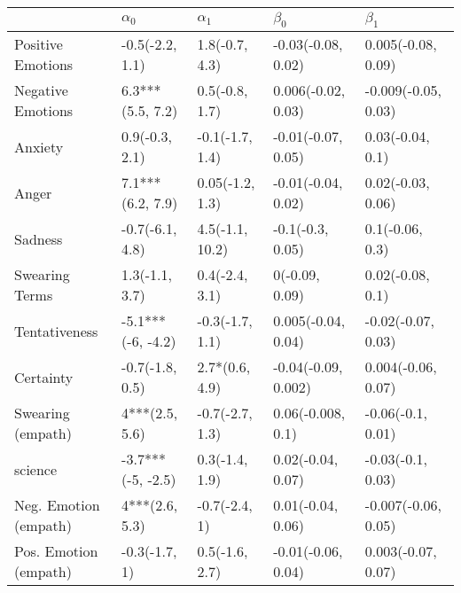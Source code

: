 \begin{tabular}{lllll}
\toprule
{} &         $\alpha_0$ &       $\alpha_1$ &            $\beta_0$ &            $\beta_1$ \\
\midrule
Positive Emotions     &    -0.5(-2.2, 1.1) &   1.8(-0.7, 4.3) &   -0.03(-0.08, 0.02) &   0.005(-0.08, 0.09) \\
Negative Emotions     &   6.3***(5.5, 7.2) &   0.5(-0.8, 1.7) &   0.006(-0.02, 0.03) &  -0.009(-0.05, 0.03) \\
Anxiety               &     0.9(-0.3, 2.1) &  -0.1(-1.7, 1.4) &   -0.01(-0.07, 0.05) &     0.03(-0.04, 0.1) \\
Anger                 &   7.1***(6.2, 7.9) &  0.05(-1.2, 1.3) &   -0.01(-0.04, 0.02) &    0.02(-0.03, 0.06) \\
Sadness               &    -0.7(-6.1, 4.8) &  4.5(-1.1, 10.2) &     -0.1(-0.3, 0.05) &      0.1(-0.06, 0.3) \\
Swearing Terms        &     1.3(-1.1, 3.7) &   0.4(-2.4, 3.1) &       0(-0.09, 0.09) &     0.02(-0.08, 0.1) \\
Tentativeness         &  -5.1***(-6, -4.2) &  -0.3(-1.7, 1.1) &   0.005(-0.04, 0.04) &   -0.02(-0.07, 0.03) \\
Certainty             &    -0.7(-1.8, 0.5) &   2.7*(0.6, 4.9) &  -0.04(-0.09, 0.002) &   0.004(-0.06, 0.07) \\
Swearing (empath)     &     4***(2.5, 5.6) &  -0.7(-2.7, 1.3) &    0.06(-0.008, 0.1) &    -0.06(-0.1, 0.01) \\
science               &  -3.7***(-5, -2.5) &   0.3(-1.4, 1.9) &    0.02(-0.04, 0.07) &    -0.03(-0.1, 0.03) \\
Neg. Emotion (empath) &     4***(2.6, 5.3) &    -0.7(-2.4, 1) &    0.01(-0.04, 0.06) &  -0.007(-0.06, 0.05) \\
Pos. Emotion (empath) &      -0.3(-1.7, 1) &   0.5(-1.6, 2.7) &   -0.01(-0.06, 0.04) &   0.003(-0.07, 0.07) \\
\bottomrule
\end{tabular}
